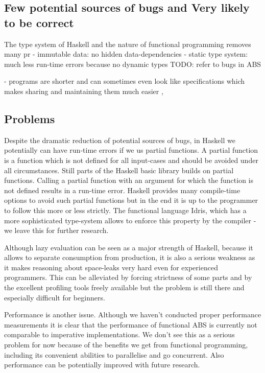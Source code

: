 \subsection{Few potential sources of bugs and Very likely to be correct}
The type system of Haskell and the nature of functional programming removes many pr
- immutable data: no hidden data-dependencies
- static type system: much less run-time errors because no dynamic types
TODO: refer to bugs in ABS

- programs are shorter and can sometimes even look like specifications which makes sharing and maintaining them much easier \cite{hudak_haskell_1994, schneider_towards_2012, vendrov_frabjous:_2014}, 

\subsection{Problems}
Despite the dramatic reduction of potential sources of bugs, in Haskell we potentially can have run-time errors if we us partial functions. A partial function is a function which is not defined for all input-cases and should be avoided under all circumstances. Still parts of the Haskell basic library builds on partial functions. Calling a partial function with an argument for which the function is not defined results in a run-time error. Haskell provides many compile-time options to avoid such partial functions but in the end it is up to the programmer to follow this more or less strictly. The functional language Idris, which has a more sophisticated type-system allows to enforce this property by the compiler - we leave this for further research.

Although lazy evaluation can be seen as a major strength of Haskell, because it allows to separate consumption from production, it is also a serious weakness as it makes reasoning about space-leaks very hard even for experienced programmers. This can be alleviated by forcing strictness of some parts and by the excellent profiling tools freely available but the problem is still there and especially difficult for beginners.

Performance is another issue. Although we haven't conducted proper performance measurements it is clear that the performance of functional ABS is currently not comparable to imperative implementations. We don't see this as a serious problem for now because of the benefits we get from functional programming, including its convenient abilities to parallelise and go concurrent. Also performance can be potentially improved with future research.

